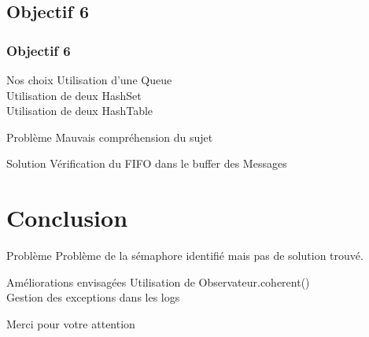 \documentclass{beamer}
\begin{document}
    \subsection{Objectif 6}
    \begin{frame}
        \frametitle{Objectif 6}
        \begin{block}{Nos choix}
            Utilisation d'une Queue\\
            Utilisation de deux HashSet\\
            Utilisation de deux HashTable
        \end{block}

        \begin{alertblock}{Problème}
            Mauvais compréhension du sujet
        \end{alertblock}

        \begin{exampleblock}{Solution}
            Vérification du FIFO dans le buffer des Messages
        \end{exampleblock}
    \end{frame}

    \section{Conclusion}
    \begin{frame}

        \begin{alertblock}{Problème}
            Problème de la sémaphore identifié mais pas de solution trouvé.
        \end{alertblock}

        \begin{exampleblock}{Améliorations envisagées}
            Utilisation de Observateur.coherent()\\
            Gestion des exceptions dans les logs\\
        \end{exampleblock}

    \end{frame}

    \begin{frame}

        Merci pour votre attention

    \end{frame}
\end{document}
